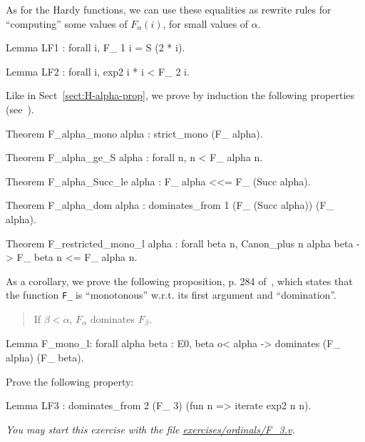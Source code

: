 As for the Hardy functions, we can use these equalities as rewrite rules for
``computing'' some values of $F_\alpha(i)$, for small values of $\alpha$.

\begin{Coqsrc}
Lemma LF1 : forall i,  F_ 1 i = S (2 * i).

Lemma LF2 : forall i, exp2 i * i < F_ 2 i.
\end{Coqsrc}


Like in Sect~\ref{sect:H-alpha-prop}, we prove by induction the following properties (see~\cite{KS81}). 

\begin{Coqsrc}
Theorem F_alpha_mono alpha : strict_mono (F_ alpha).
 
Theorem F_alpha_ge_S alpha : forall n, n < F_ alpha n.

Theorem F_alpha_Succ_le alpha : F_ alpha <<= F_ (Succ alpha).

Theorem F_alpha_dom alpha : 
     dominates_from 1 (F_ (Succ alpha)) (F_ alpha).

Theorem F_restricted_mono_l alpha : 
   forall beta n, Canon_plus n alpha beta -> 
                                        F_ beta n <= F_ alpha n.
\end{Coqsrc}

As a corollary, we prove the following proposition, p. 284 of~\cite{KS81}, which states that the function \texttt{F\_} is ``monotonous'' w.r.t. its first argument and ``domination''.


\begin{quote}
  If $\beta<\alpha$, $F_\alpha$ dominates $F_\beta$.
\end{quote}

\begin{Coqsrc}
Lemma F_mono_l: forall alpha beta : E0, 
   beta o< alpha -> dominates (F_ alpha) (F_ beta).
\end{Coqsrc}


\begin{exercise}
Prove the following property:

\begin{Coqsrc}
Lemma LF3 : dominates_from  2 (F_ 3) (fun  n => iterate exp2 n n).
\end{Coqsrc}

\emph{You may start this exercise with the file
\href{https://github.com/coq-community/hydra-battles/tree/master/exercises/ordinals/F_3.v}{exercises/ordinals/F\_3.v}.}
\end{exercise}


